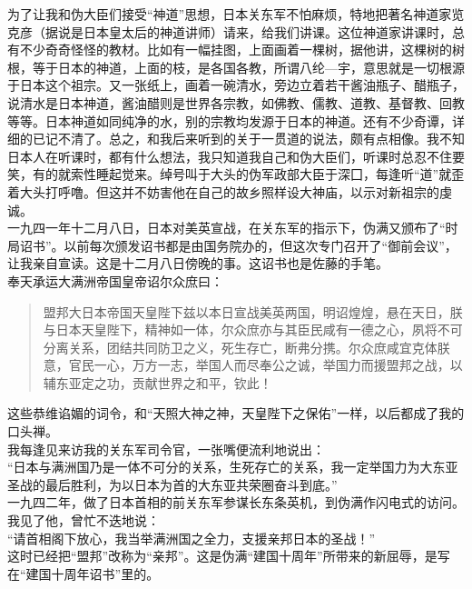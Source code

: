 为了让我和伪大臣们接受“神道”思想，日本关东军不怕麻烦，特地把著名神道家览克彦（据说是日本皇太后的神道讲师）请来，给我们讲课。这位神道家讲课时，总有不少奇奇怪怪的教材。比如有一幅挂图，上面画着一棵树，据他讲，这棵树的树根，等于日本的神道，上面的枝，是各国各教，所谓八纶—宇，意思就是一切根源于日本这个祖宗。又一张纸上，画着一碗清水，旁边立着若干酱油瓶子、醋瓶子，说清水是日本神道，酱油醋则是世界各宗教，如佛教、儒教、道教、基督教、回教等等。日本神道如同纯净的水，别的宗教均发源于日本的神道。还有不少奇谭，详细的已记不清了。总之，和我后来听到的关于一贯道的说法，颇有点相像。我不知日本人在听课时，都有什么想法，我只知道我自己和伪大臣们，听课时总忍不住要笑，有的就索性睡起觉来。绰号叫于大头的伪军政部大臣于深囗，每逢听“道”就歪着大头打呼噜。但这并不妨害他在自己的故乡照样设大神庙，以示对新祖宗的虔诚。\\

一九四一年十二月八日，日本对美英宣战，在关东军的指示下，伪满又颁布了“时局诏书”。以前每次颁发诏书都是由国务院办的，但这次专门召开了“御前会议”，让我亲自宣读。这是十二月八日傍晚的事。这诏书也是佐藤的手笔。\\

奉天承运大满洲帝国皇帝诏尔众庶曰：\\

\begin{quote}
	盟邦大日本帝国天皇陛下兹以本日宣战美英两国，明诏煌煌，悬在天日，朕与日本天皇陛下，精神如一体，尔众庶亦与其臣民咸有一德之心，夙将不可分离关系，团结共同防卫之义，死生存亡，断弗分携。尔众庶咸宜克体朕意，官民一心，万方一志，举国人而尽奉公之诚，举国力而援盟邦之战，以辅东亚定之功，贡献世界之和平，钦此！
\end{quote}

这些恭维谄媚的词令，和“天照大神之神，天皇陛下之保佑”一样，以后都成了我的口头禅。\\

我每逢见来访我的关东军司令官，一张嘴便流利地说出：\\

“日本与满洲国乃是一体不可分的关系，生死存亡的关系，我一定举国力为大东亚圣战的最后胜利，为以日本为首的大东亚共荣圈奋斗到底。”\\

一九四二年，做了日本首相的前关东军参谋长东条英机，到伪满作闪电式的访问。我见了他，曾忙不迭地说：\\

“请首相阁下放心，我当举满洲国之全力，支援亲邦日本的圣战！”\\

这时已经把“盟邦”改称为“亲邦”。这是伪满“建国十周年”所带来的新屈辱，是写在“建国十周年诏书”里的。\\

